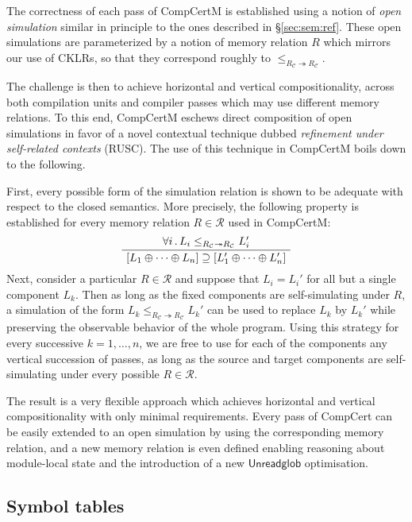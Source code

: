 \documentclass[sigplan,10pt,review]{acmart}
\newcommand{\kw}[1]{\ensuremath{ \mathsf{#1} }}
\begin{document}
The correctness of each pass of CompCertM
is established using a notion of \emph{open simulation}
similar in principle to the ones described in \S\ref{sec:sem:ref}.
These open simulations
are parameterized by a notion of memory relation $R$
which mirrors our use of CKLRs,
so that they correspond roughly to
$\le_{R_\mathcal{C} \twoheadrightarrow R_\mathcal{C}}$.

The challenge is then to achieve
horizontal and vertical compositionality,
across both compilation units and compiler passes
which may use different memory relations.
To this end,
CompCertM eschews direct composition of open simulations
in favor of a novel contextual technique dubbed
\emph{refinement under self-related contexts} (RUSC).
The use of this technique in CompCertM boils down to the following.

First,
every possible form of the simulation relation
is shown to be adequate with respect to the closed semantics.
More precisely,
the following property is established
for every memory relation $R \in \mathcal{R}$
used in CompCertM:
\begin{equation} \label{eqn:simadeq}
  \AxiomC{$\forall i \,.\,
    L_i \le_{R_\mathcal{C} \twoheadrightarrow R_\mathcal{C}} L_i'$}
  \UnaryInfC{$
    [L_1  \oplus \cdots \oplus L_n] \supseteq
    [L_1' \oplus \cdots \oplus L_n']$}
  \DisplayProof
\end{equation}
Next,
consider a particular $R \in \mathcal{R}$
and suppose that $L_i = L_i'$
for all but a single component $L_k$.
Then
as long as the fixed components are self-simulating under $R$,
a simulation of the form
$L_k \le_{R_\mathcal{C} \twoheadrightarrow R_\mathcal{C}} L_k'$
can be used to replace $L_k$ by $L_k'$
while preserving the observable behavior of the whole program.
Using this strategy for every successive $k = 1, \ldots, n$,
we are free to use for each of the components
any vertical succession of passes,
as long as the source and target components
are self-simulating under every possible $R \in \mathcal{R}$.

The result is a very flexible approach
which achieves horizontal and vertical compositionality
with only minimal requirements.
Every pass of CompCert can be easily
extended to an open simulation
by using the corresponding memory relation,
and a new memory relation is even defined
enabling reasoning about module-local state
and the introduction of a new \kw{Unreadglob} optimisation.


\subsection{Symbol tables} %
\end{document}
